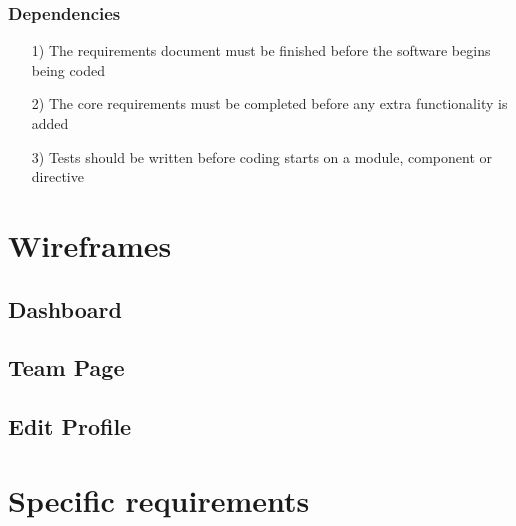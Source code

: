 \documentclass[10pt,a4paper]{article}
\begin{document}
\subsubsection*{Dependencies}
\begin{itemize}
\item[1)]
The requirements document must be finished before the software begins being coded

\item[2)]
The core requirements must be completed before any extra functionality is added

\item[3)]
Tests should be written before coding starts on a module, component or directive
\end{itemize}

%

\newpage
\section{Wireframes}

\newpage
\subsection{Dashboard}

\newpage
\subsection{Team Page}

\newpage
\subsection{Edit Profile}

\newpage
\section{Specific requirements}
\end{document}

